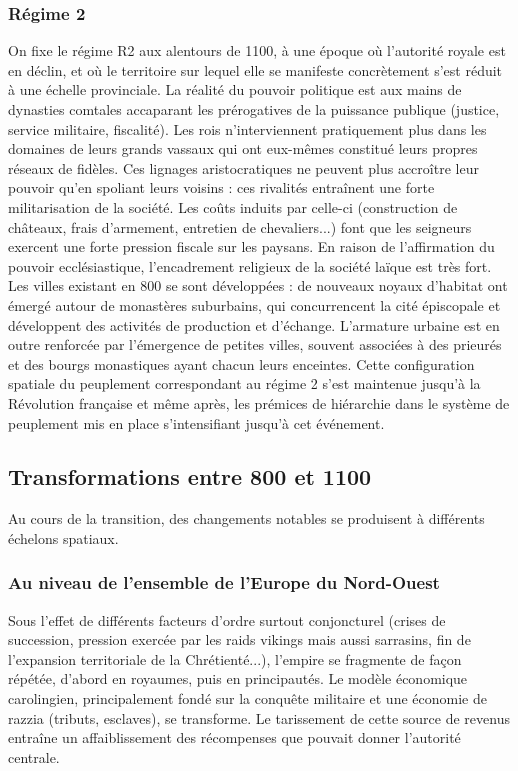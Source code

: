 \documentclass[12pt, a4paper, oneside]{book}
\begin{document}
	\subsubsection{Régime 2}
	On fixe le régime R2 aux alentours de 1100, à une époque où l'autorité royale est en déclin, et où le territoire sur lequel elle se manifeste concrètement s'est réduit à une échelle provinciale.
	La réalité du pouvoir politique est aux mains de dynasties comtales accaparant les prérogatives de la puissance publique (justice, service militaire, fiscalité).
	Les rois n'interviennent pratiquement plus dans les domaines de leurs grands vassaux qui ont eux-mêmes constitué leurs propres réseaux de fidèles.
	Ces lignages aristocratiques ne peuvent plus accroître leur pouvoir qu'en spoliant leurs voisins : ces rivalités entraînent une forte militarisation de la société.
	Les coûts induits par celle-ci (construction de châteaux, frais d'armement, entretien de chevaliers...) font que les seigneurs exercent une forte pression fiscale sur les paysans.
	En raison de l'affirmation du pouvoir ecclésiastique, l'encadrement religieux de la société laïque est très fort.
	Les villes existant en 800 se sont développées : de nouveaux noyaux d'habitat ont émergé autour de monastères suburbains, qui concurrencent la cité épiscopale et développent des activités de production et d'échange.
	L'armature urbaine est en outre renforcée par l'émergence de petites villes, souvent associées à des prieurés et des bourgs monastiques ayant chacun leurs enceintes.
	Cette configuration spatiale du peuplement correspondant au régime 2 s'est maintenue jusqu'à la Révolution française et même après, les prémices de hiérarchie dans le système de peuplement mis en place s'intensifiant jusqu'à cet événement.
	
	
	\subsection{Transformations entre 800 et 1100}
	
	Au cours de la transition, des changements notables se produisent à différents échelons spatiaux.
	
	\subsubsection{Au niveau de l'ensemble de l'Europe du Nord-Ouest}
	
	Sous l'effet de différents facteurs d'ordre surtout conjoncturel (crises de succession, pression exercée par les raids vikings mais aussi sarrasins, fin de l'expansion territoriale de la Chrétienté...), l'empire se fragmente de façon répétée, d'abord en royaumes, puis en principautés.
	Le modèle économique carolingien, principalement fondé sur la conquête militaire et une économie de razzia (tributs, esclaves), se transforme.
	Le tarissement de cette source de revenus entraîne un affaiblissement des récompenses que pouvait donner l'autorité centrale.
	
\end{document}
